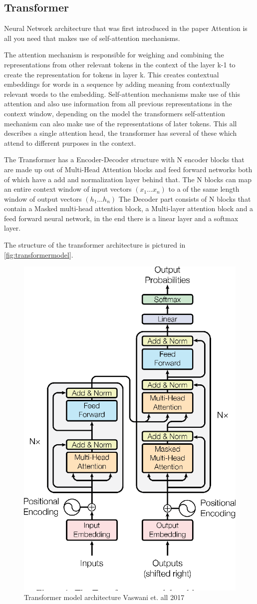 \subsection{Transformer}
Neural Network architecture that was first introduced in the paper Attention is all you need \cite{vaswani2023attentionneed} that makes use of self-attention mechanisms. 

The attention mechanism is responsible for weighing and combining the representations from other relevant tokens in the context of the layer k-1 to create the representation for tokens in layer k. This creates contextual embeddings for words in a sequence by adding meaning from contextually relevant words to the embedding. 
Self-attention mechanisms make use of this attention and also use information from all previous representations in the context window, depending on the model the transformers self-attention mechanism can also make use of the representations of later tokens. This all describes a single attention head, the transformer has several of these which attend to different purposes in the context.

The Transformer has a Encoder-Decoder structure with N encoder blocks that are made up out of Multi-Head Attention blocks and feed forward networks both of which have a add and normalization layer behind that. 
The N blocks can map an entire context window of input vectors $(x_1\dots x_n)$ to a of the same length window of output vectors $(h_1\dots h_n)$ 
The Decoder part consists of N blocks that contain a Masked multi-head attention block, a Multi-layer attention block and a feed forward neural network, in the end there is a linear layer and a softmax layer. \cite[chapter~9]{jm3}

The structure of the transformer architecture is pictured in \autoref{fig:transformermodel}.
\begin{figure}
        \centering%
        \includegraphics[width=0.5\linewidth]{Latex//sections//images/transformermodel.png}
        \caption{Transformer model architecture Vaswani et. all 2017}
        \label{fig:transformermodel}
    \end{figure}

